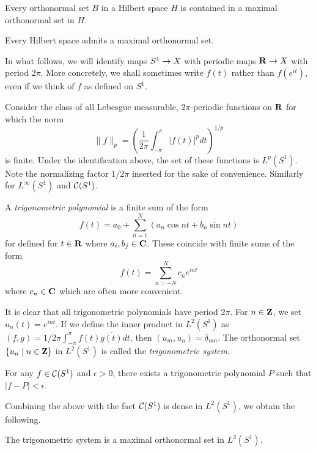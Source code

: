 \begin{theorem}
  Every orthonormal set $B$ in a Hilbert space $H$ is contained in a maximal orthonormal set in $H$.
\end{theorem}

\begin{corollary}
  Every Hilbert space admits a maximal orthonormal set.
\end{corollary}

In what follows, we will identify maps $S^1 \rightarrow X$ with periodic maps $\mathbf{R} \rightarrow X$ with period $2\pi$. More concretely, we shall sometimes write $f(t)$ rather than $f(e^{i t})$, even if we think of $f$ as defined on $S^1$.

Consider the class of all Lebesgue measurable, $2\pi$-periodic functions on $\mathbf{R}$ for which the norm
\[
\|f\|_p = \left( \frac{1}{2\pi} \int_{-\pi}^\pi |f(t)|^p d t \right)^{1/p}
\]
is finite. Under the identification above, the set of these functions is $L^p(S^1)$. Note the normalizing factor $1/2\pi$ inserted for the sake of convenience. Similarly for $L^\infty(S^1)$ and $\mathcal{C}(S^1)$.

\begin{definition}
  A \emph{trigonometric polynomial} is a finite sum of the form
  \[
  f(t) = a_0 + \sum_{n=1}^N (a_n \cos n t + b_n \sin n t)
  \]
  for defined for $t \in \mathbf{R}$ where $a_i, b_j \in \mathbf{C}$. These coincide with finite sums of the form
  \[
  f(t)= \sum_{n=-N}^N c_n e^{i n t}
  \]
  where $c_n \in \mathbf{C}$ which are often more convenient.
\end{definition}

It is clear that all trigonometric polynomials have period $2\pi$. For $n \in \mathbf{Z}$, we set $u_n(t) = e^{i n t}$. If we define the inner product in $L^2(S^1)$ as $(f,g) = 1/2\pi \int_{-\pi}^\pi f(t)\overline{g(t)} d t$, then $(u_m,u_n) = \delta_{m n}$. The orthonormal set $\{ u_n \;|\; n \in \mathbf{Z} \}$ in $L^2(S^1)$ is called the \emph{trigonometric system}.

\begin{theorem}
  For any $f \in \mathcal{C}(S^1)$ and $\epsilon > 0$, there exists a trigonometric polynomial $P$ such that $|f-P| < \epsilon$.
\end{theorem}

Combining the above with the fact $\mathcal{C}(S^1)$ is dense in $L^2(S^1)$, we obtain the following.

\begin{corollary}
  The trigonometric system is a maximal orthonormal set in $L^2(S^1)$.
\end{corollary}

